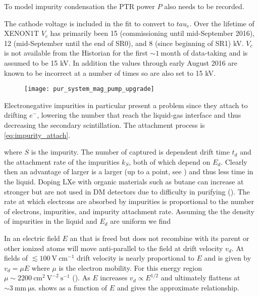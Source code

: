 To model impurity condensation the PTR power $P$ also needs to be recorded.

The cathode voltage is included in the fit to convert \il to $tau_e$.  Over the lifetime of XENON1T $V_c$ has primarily been 15
(commissioning until mid-September 2016), 12 (mid-September until the end of SR0), and 8 (since beginning of SR1) kV.  $V_c$ is not
available from the Historian for the first ${\sim} 1\ \mathrm{month}$ of data-taking and is assumed to be 15 kV.  In addition the values
through early August 2016 are known to be incorrect at a number of times so are also set to 15 kV.

\begin{figure}
\centering
\texttt{[image: pur\_system\_mag\_pump\_upgrade]}
\caption{}
\label{fig:mag_pump}
\end{figure}

Electronegative impurities
in particular present a problem
since they attach to drifting $e^{-}$,
lowering the number that reach the liquid-gas interface and thus decreasing the secondary scintillation.  The attachment process
is \eqref{eq:impurity_attach}.

\noindent where $S$ is the impurity.  The number of \electron captured is dependent drift time $t_{d}$ and the
attachment rate of
the impurities $k_{S}$, both of which depend on $E_{d}$.  Clearly then an advantage of larger
\efields is a larger
\vd (up to a point, see ) and thus less time in the liquid.  Doping LXe with organic materials such as butane
can increase \vd at stronger
\efields but are not used in DM detectors due to difficulty in purifying ().  The rate at which electrons are
absorbed by impurities is proportional to the number of electrons, impurities, and impurity attachment rate.  Assuming the the density
of impurities in the liquid and $E_{d}$ are uniform we find

In an electric field $E$ an \electron that is freed but does not recombine with its parent or other ionized atoms will move anti-parallel
to the field at drift velocity $v_{d}$.  At fields of $\lesssim 100\ \mathrm{V\ cm^{-1}}$ drift velocity is nearly proportional to
$E$ and is given by $v_{d} = \mu E$
where $\mu$ is the electron mobility.  For this energy region $\mu \sim 2200\ \mathrm{cm^{2}\ V^{-2}\ s^{-1}}$ ().  As
$E$ increases $v_{d} \propto E^{1/2}$ and ultimately flattens at $\sim 3\ \mathrm{mm\ \mu s}$.   shows \vd
as a function of $E$ and  gives the approximate relationship.

